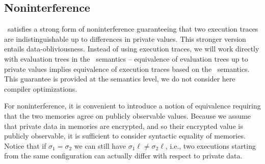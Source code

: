 \subsection{Noninterference} \label{sec: noninterference}
\piccoC\ satisfies a strong form of noninterference guaranteeing that two execution traces are indistinguishable up to differences in private values. This stronger version entails data-obliviousness. Instead of using execution traces, we will work directly with evaluation trees in the \piccoC\ semantics -- equivalence of evaluation trees up to private values implies equivalence of execution traces based on the \piccoC\ semantics. This guarantee is provided at the semantics level, we do not consider here compiler optimizations.   

For noninterference, it is convenient to introduce a notion of equivalence requiring that the two memories agree on publicly observable values. Because we assume that private data in memories are encrypted, and so their encrypted value is publicly observable, it is sufficient to consider syntactic equality of memories. Notice that if $\sigma_1=\sigma_2$ we can still have $\sigma_1\ell \neq \sigma_2\ell$, i.e., two executions starting from the same configuration can actually differ with respect to private data. 


